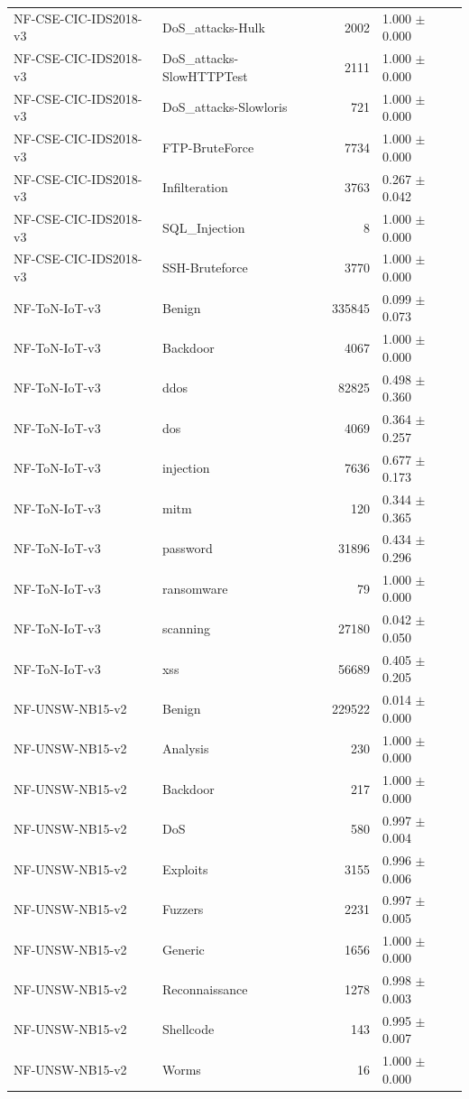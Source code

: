 \begin{tabular}{llrl}
NF-CSE-CIC-IDS2018-v3 & DoS_attacks-Hulk & 2002 & 1.000 $\pm$ 0.000 \\
NF-CSE-CIC-IDS2018-v3 & DoS_attacks-SlowHTTPTest & 2111 & 1.000 $\pm$ 0.000 \\
NF-CSE-CIC-IDS2018-v3 & DoS_attacks-Slowloris & 721 & 1.000 $\pm$ 0.000 \\
NF-CSE-CIC-IDS2018-v3 & FTP-BruteForce & 7734 & 1.000 $\pm$ 0.000 \\
NF-CSE-CIC-IDS2018-v3 & Infilteration & 3763 & 0.267 $\pm$ 0.042 \\
NF-CSE-CIC-IDS2018-v3 & SQL_Injection & 8 & 1.000 $\pm$ 0.000 \\
NF-CSE-CIC-IDS2018-v3 & SSH-Bruteforce & 3770 & 1.000 $\pm$ 0.000 \\
NF-ToN-IoT-v3 & Benign & 335845 & 0.099 $\pm$ 0.073 \\
NF-ToN-IoT-v3 & Backdoor & 4067 & 1.000 $\pm$ 0.000 \\
NF-ToN-IoT-v3 & ddos & 82825 & 0.498 $\pm$ 0.360 \\
NF-ToN-IoT-v3 & dos & 4069 & 0.364 $\pm$ 0.257 \\
NF-ToN-IoT-v3 & injection & 7636 & 0.677 $\pm$ 0.173 \\
NF-ToN-IoT-v3 & mitm & 120 & 0.344 $\pm$ 0.365 \\
NF-ToN-IoT-v3 & password & 31896 & 0.434 $\pm$ 0.296 \\
NF-ToN-IoT-v3 & ransomware & 79 & 1.000 $\pm$ 0.000 \\
NF-ToN-IoT-v3 & scanning & 27180 & 0.042 $\pm$ 0.050 \\
NF-ToN-IoT-v3 & xss & 56689 & 0.405 $\pm$ 0.205 \\
NF-UNSW-NB15-v2 & Benign & 229522 & 0.014 $\pm$ 0.000 \\
NF-UNSW-NB15-v2 & Analysis & 230 & 1.000 $\pm$ 0.000 \\
NF-UNSW-NB15-v2 & Backdoor & 217 & 1.000 $\pm$ 0.000 \\
NF-UNSW-NB15-v2 & DoS & 580 & 0.997 $\pm$ 0.004 \\
NF-UNSW-NB15-v2 & Exploits & 3155 & 0.996 $\pm$ 0.006 \\
NF-UNSW-NB15-v2 & Fuzzers & 2231 & 0.997 $\pm$ 0.005 \\
NF-UNSW-NB15-v2 & Generic & 1656 & 1.000 $\pm$ 0.000 \\
NF-UNSW-NB15-v2 & Reconnaissance & 1278 & 0.998 $\pm$ 0.003 \\
NF-UNSW-NB15-v2 & Shellcode & 143 & 0.995 $\pm$ 0.007 \\
NF-UNSW-NB15-v2 & Worms & 16 & 1.000 $\pm$ 0.000 \\

\end{tabular}
